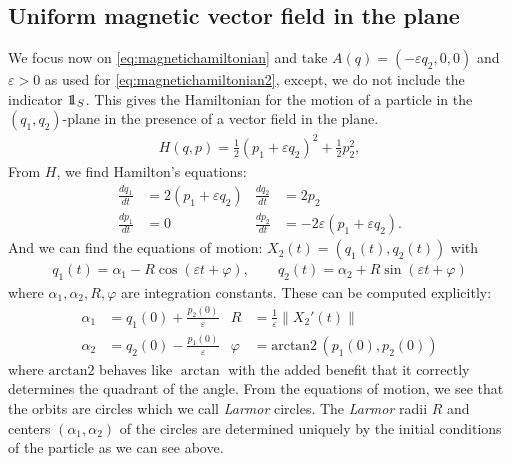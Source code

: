 \subsection{Uniform magnetic vector field in the plane}

We focus now on \eqref{eq:magnetichamiltonian} and take $A(q)=(-\varepsilon q_2,0,0)$ and $\varepsilon>0$ as used for \eqref{eq:magnetichamiltonian2}, except, we do not include the indicator $\one_S$. This gives the Hamiltonian for the motion of a particle in the $(q_1,q_2)$-plane in the presence of a vector field in the plane.
\begin{align}
H(q,p) =
\frac{1}{2}(p_1+\varepsilon q_2)^2+\frac{1}{2}p_2^2,
\end{align}
From $H$, we find Hamilton's equations:
\begin{align*}
\frac{dq_1}{dt} &= 2(p_1+\varepsilon q_2) 	& \frac{dq_2}{dt} &= 2p_2\\
\frac{dp_1}{dt} &=0							& \frac{dp_2}{dt} &=-2\varepsilon(p_1+\varepsilon q_2).
\end{align*}
And we can find the equations of motion: $X_2(t) = (q_1(t),q_2(t))$ with
\begin{align*}
q_1(t) = \alpha_1 - R\cos(\varepsilon t+\varphi),\qquad 
q_2(t) = \alpha_2 + R\sin(\varepsilon t+\varphi)
\end{align*}
where $\alpha_1,\alpha_2,R,\varphi$ are integration constants. These can be computed explicitly:
\begin{align*}
\alpha_1 &= q_1(0)+\frac{p_2(0)}{\varepsilon} &
		R &= \frac{1}{\varepsilon}\|X_2'(t)\|\\
\alpha_2  &= q_2(0)-\frac{p_1(0)}{\varepsilon} &
		\varphi &= \text{arctan2}\,(p_1(0),p_2(0))
\end{align*}
where $\text{arctan2}$ behaves like $\arctan$ with the added benefit that it correctly determines the quadrant of the angle. From the equations of motion, we see that the orbits are circles which we call \textit{Larmor} circles. The \textit{Larmor} radii $R$ and centers  $(\alpha_1,\alpha_2)$ of the circles are determined uniquely by the initial conditions of the particle as we can see above.
